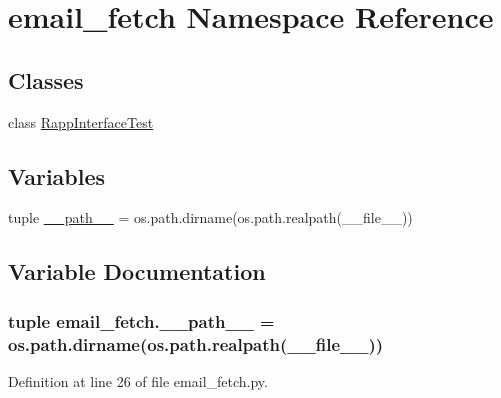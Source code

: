 \hypertarget{namespaceemail__fetch}{\section{email\-\_\-fetch Namespace Reference}
\label{namespaceemail__fetch}
}
\subsection*{Classes}
\begin{DoxyCompactItemize}
\item 
class \hyperlink{classemail__fetch_1_1RappInterfaceTest}{Rapp\-Interface\-Test}
\end{DoxyCompactItemize}
\subsection*{Variables}
\begin{DoxyCompactItemize}
\item 
tuple \hyperlink{namespaceemail__fetch_a5d11292e81d47effab4146ad712d007b}{\-\_\-\-\_\-path\-\_\-\-\_\-} = os.\-path.\-dirname(os.\-path.\-realpath(\-\_\-\-\_\-file\-\_\-\-\_\-))
\end{DoxyCompactItemize}


\subsection{Variable Documentation}
\hypertarget{namespaceemail__fetch_a5d11292e81d47effab4146ad712d007b}{
\subsubsection[{\-\_\-\-\_\-path\-\_\-\-\_\-}]{\setlength{\rightskip}{0pt plus 5cm}tuple email\-\_\-fetch.\-\_\-\-\_\-path\-\_\-\-\_\- = os.\-path.\-dirname(os.\-path.\-realpath(\-\_\-\-\_\-file\-\_\-\-\_\-))}}\label{namespaceemail__fetch_a5d11292e81d47effab4146ad712d007b}


Definition at line 26 of file email\-\_\-fetch.\-py.

